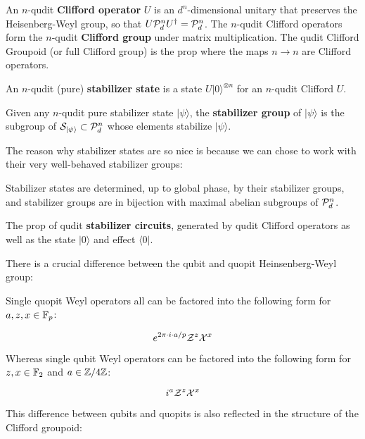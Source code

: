 \begin{definition}
An $n$-qudit {\bf Clifford operator} $U$ is an $d^n$-dimensional unitary that preserves the Heisenberg-Weyl group, so that $U {\cal P}_d^{ n} U^\dag = {\cal P}_d^{ n}$.  The $n$-qudit Clifford operators form the $n$-qudit {\bf Clifford group } under matrix multiplication.  The qudit Clifford Groupoid (or full Clifford group) is the prop where the maps $n\to n$ are Clifford operators.


An $n$-qudit (pure) {\bf stabilizer state} is a state $ U |0\rangle^{\otimes n}$ for an $n$-qudit Clifford $U$.


Given any $n$-qudit pure stabilizer state $|\psi \rangle$,  the {\bf stabilizer group} of $|\psi \rangle$   is the subgroup of ${\cal S}_{|\psi\rangle} \subset {\cal P}_d^{ n}$  whose elements  stabilize $|\psi\rangle$.
\end{definition}

The reason why stabilizer states are so nice is because we can chose to work with their very well-behaved stabilizer groups:


\begin{lemma}
Stabilizer states are determined, up to global phase, by their stabilizer groups, and stabilizer groups are in bijection with maximal abelian subgroups of $ {\cal P}_d^{ n}$.
\end{lemma}



\begin{definition}
The prop of qudit {\bf stabilizer circuits}, generated by qudit Clifford operators as well as the state $|0\rangle$ and effect $\langle 0|$.
\end{definition}



There is a crucial difference between the  qubit and quopit Heinsenberg-Weyl group:

\begin{lemma}
Single quopit Weyl operators all can be factored into the following form for $a,z,x \in \mathbb{F}_p$:

$$
e^{2\pi \cdot i\cdot a /p} {\cal Z}^z{\cal X}^x
$$

Whereas single qubit Weyl operators can be factored into the following form for $z,x \in \mathbb{F}_2$ and $a \in \mathbb{Z}/4\mathbb{Z}$:

$$
 i^a {\cal Z}^z{\cal X}^x
$$

\end{lemma}

This difference between qubits and quopits  is also reflected in the structure of the Clifford groupoid:

